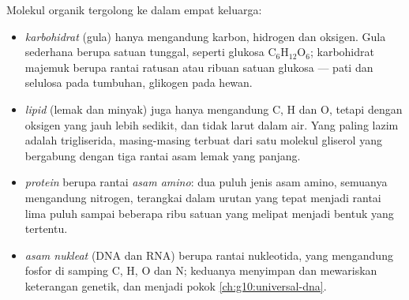 \begin{definition}\label{def:g10:chemistry-of-life:families}
Molekul organik tergolong ke dalam empat keluarga:
\begin{itemize}
  \item \emph{karbohidrat} (gula) hanya mengandung
        karbon, hidrogen dan oksigen. Gula sederhana berupa satuan
        tunggal, seperti glukosa $\mathrm{C_6H_{12}O_6}$; karbohidrat
        majemuk berupa rantai ratusan atau ribuan satuan glukosa ---
        pati dan selulosa pada tumbuhan, glikogen pada hewan.
  \item \emph{lipid} (lemak dan minyak) juga hanya
        mengandung C, H dan O, tetapi dengan oksigen yang jauh lebih
        sedikit, dan tidak larut dalam air. Yang paling lazim adalah
        trigliserida, masing-masing terbuat dari satu molekul gliserol
        yang bergabung dengan tiga rantai asam lemak yang panjang.
  \item \emph{protein} berupa rantai
        \emph{asam amino}: dua puluh jenis asam
        amino, semuanya mengandung nitrogen, terangkai dalam urutan
        yang tepat menjadi rantai lima puluh sampai beberapa ribu
        satuan yang melipat menjadi bentuk yang tertentu.
  \item \emph{asam nukleat} (DNA dan RNA) berupa
        rantai nukleotida, yang mengandung fosfor di samping C, H,
        O dan N; keduanya menyimpan dan mewariskan keterangan genetik,
        dan menjadi pokok \cref{ch:g10:universal-dna}.
\end{itemize}
\end{definition}


